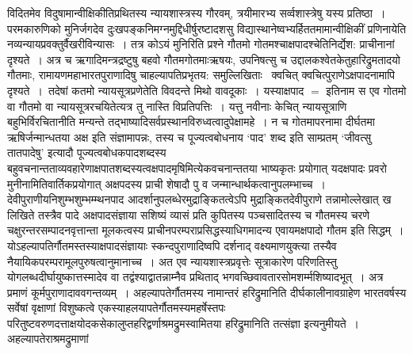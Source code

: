 \documentclass[10pt, openany]{book}
\begin{document}
विदितमेव विदुषामान्वीक्षिकीतिप्रथितस्य न्यायशास्त्रस्य गौरवम्, त्रयीमारभ्य सर्व्वशास्त्रेषु यस्य प्रतिष्ठा~। परमकारुणिको मुनिर्जगदेव दुःखपङ्कनिमग्नमुद्दिधीर्षुरष्टादशसु विद्यास्थानेष्वभ्यर्हिततमामान्वीक्षिकीं प्रणिनायेति नव्यन्यायप्रवक्तुर्वैखरीविन्यासः~। तत्र कोऽयं मुनिरिति प्रश्ने गौतमो गोतमश्चाक्षपादश्चेतिनिर्द्येश: प्राचीनानां दृश्यते~। अत्र च ऋगादिमन्त्रद्रष्टुषु बहवो गौतमगोतमाःऋषयः, उपनिषत्सु च उद्दालकश्वेतकेतुहारिद्रुमतादयो गौतमाः, रामायणमहाभारतपुराणादिषु चाहल्यापतिप्रभृतय: समुल्लिखिताः~ क्वचित् क्वचित्पुराणेऽक्षपादनामापि दृश्यते~।~तदेषां कतमो न्यायसूत्रप्रणेतेति विवदन्ते मिथो वावदूकाः~। यस्याक्षपाद $=$ इतिनाम स एव गोतमो वा गौतमो वा न्यायसूत्ररचयितेत्यत्र तु नास्ति विप्रतिपत्तिः~। यत्तु नवीनाः केचित् न्यायसूत्राणि बहुभिर्विरचितानीति मन्यन्ते तद्भाष्यादिसर्वप्रस्थानविरुध्वत्वादुपेक्षामहे~। न च गोतमापरनामा
दीर्घतमा ऋषिर्जन्मान्धतया अक्ष इति संज्ञामापन्नः, तस्य च पूज्यत्वबोधनाय `पाद' शब्द इति साम्प्रतम्  `जीवत्सु तातपादेषु' इत्यादौ पूज्यत्वबोधकपादशब्दस्य बहुवचनान्तताव्यवहारेणाक्षपातशब्दस्यत्वक्षपादमृषिमित्येकवचनान्ततया भाष्यकृतः प्रयोगात् यदक्षपादः प्रवरो मुनीनामितिवार्तिकप्रयोगात् अक्षपदस्य
प्राची शेषादौ पु व जन्मान्धार्थकत्वानुपलम्भाच्च~। देवीपुराणीयनिशुम्भशुम्भम्म्थनपाद आदर्शानुपलब्धेरमुद्राङ्कितत्वेऽपि मुद्राङ्कितदेवीपुराणे तन्नामोल्लेखात् ख लिखिते तस्त्रैव पादे अक्षपादसंज्ञाया सशिष्यं व्यासं प्रति कुपितस्य पञ्चसादितस्य  च गौतमस्य चरणे चक्षुरन्तरसम्पादनवृत्तान्ता
\newpage
\noindent
 मूलकत्वस्य प्राचीनपरम्पराप्रसिद्धस्याधिगमादन्य एवायमक्षपादो गौतम इति सिद्धम्~। योऽहल्यापतिर्गौतमस्तस्याक्षपादसंज्ञायाः स्कन्दपुराणादिष्वपि दर्शनाद् वक्ष्यमाणयुक्त्या तस्यैव नैयायिकपरम्परामूलपुरुषत्वानुमानाच्च~। अत एव न्यायशास्त्रप्रवृत्तेः सूत्राकारेण परिणतिस्तु योगलब्धदीर्घायुष्कात्तस्मादेव वा तद्वंश्याद्वातन्नाम्नैव प्रथिताद्  भगवच्छिवावतारसोमशर्म्मशिष्यादभूत्~। अत्र प्रमाणं कूर्मपुराणादाववगन्तव्यम्~। अहल्यापतेर्गौतमस्य नामान्तरं हरिद्रुमानिति दीर्घकालीनावग्राहेण भारतवर्षस्य सर्वेषां वृक्षाणां विशुष्कत्वे एकस्याहलयापतेर्गौतमस्यमहर्षेस्तपः परितुष्टवरुणदत्ताक्षयोदकसेकालुप्तहरिद्वर्णाश्रमद्रुमस्वामितया हरिद्रुमानिति तत्संज्ञा इत्यनुमीयते~। अहल्यापतेराश्रमद्रुमाणां
\end{document}
